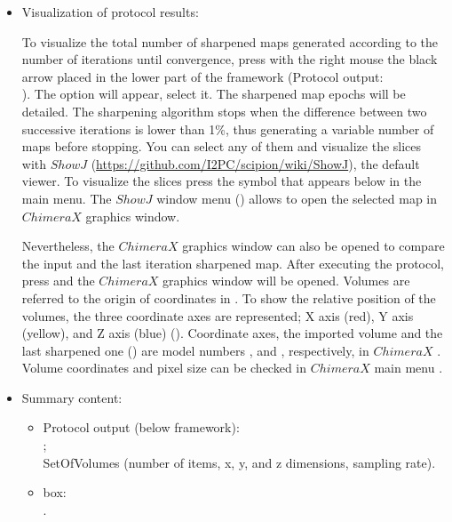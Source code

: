 \begin{itemize}
  \item Visualization of protocol results:
  
  To visualize the total number of sharpened maps generated according to the number of iterations until convergence, press with the right mouse the black arrow placed in the lower part of the \scipion framework (Protocol output:\\ ). The option  will appear, select it. The sharpened map epochs will be detailed. The sharpening algorithm stops when the difference between two successive iterations is lower than 1\%, thus generating a variable number of maps before stopping. You can select any of them and visualize the slices with $ShowJ$ (\url{https://github.com/I2PC/scipion/wiki/ShowJ}), the default \scipion viewer. To visualize the slices press the symbol that appears below  in the main menu. The $ShowJ$ window menu () allows to open the selected map in $ChimeraX$ graphics window.
  
  Nevertheless, the $ChimeraX$ graphics window can also be opened to compare the input and the last iteration sharpened map. After executing the protocol, press  and the $ChimeraX$ graphics window will be opened. Volumes are referred to the origin of coordinates in \chimera. To show the relative position of the volumes, the three coordinate axes are represented; X axis (red), Y axis (yellow), and Z axis (blue) (). Coordinate axes, the imported volume and the last sharpened one () are model numbers ,  and , respectively, in $ChimeraX$ . Volume coordinates and pixel size can be checked in $ChimeraX$ main menu . 

  
  
  \item Summary content:
  \begin{itemize}
     \item Protocol output (below \scipion framework):\\ ;\\ SetOfVolumes (number of items, x, y, and z dimensions, sampling rate).
     \item {} box:\\ .
  \end{itemize}
    
\end{itemize}
